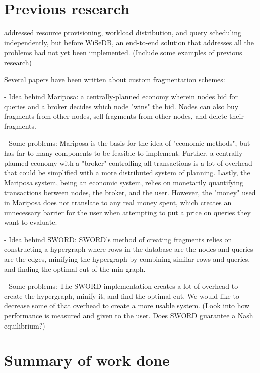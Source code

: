 \documentclass{tufte-book} %
\begin{document}
\section{Previous research}

 addressed resource provisioning, workload distribution, and query scheduling independently, but before WiSeDB, an end-to-end solution that addresses all the problems had not yet been implemented. (Include some examples of previous research)

Several papers have been written about custom fragmentation schemes:


- Idea behind Mariposa: a centrally-planned economy wherein nodes bid for queries and a broker decides which node "wins" the bid. Nodes can also buy fragments from other nodes, sell fragments from other nodes, and delete their fragments.

- Some problems:
	Mariposa is the basis for the idea of "economic methods", but has far to many components to be feasible to implement. Further, a centrally planned economy with a "broker" controlling all transactions is a lot of overhead that could be simplified with a more distributed system of planning. Lastly, the Mariposa system, being an economic system, relies on monetarily quantifying transactions between nodes, the broker, and the user. However, the "money" used in Mariposa does not translate to any real money spent, which creates an unnecessary barrier for the user when attempting to put a price on queries they want to evaluate.


- Idea behind SWORD: SWORD's method of creating fragments relies on constructing a hypergraph where rows in the database are the nodes and queries are the edges, minifying the hypergraph by combining similar rows and queries, and finding the optimal cut of the min-graph.

- Some problems: The SWORD implementation creates a lot of overhead to create the hypergraph, minify it, and find the optimal cut. We would like to decrease some of that overhead to create a more usable system. (Look into how performance is measured and given to the user. Does SWORD guarantee a Nash equilibrium?)


\section{Summary of work done}
\end{document}
